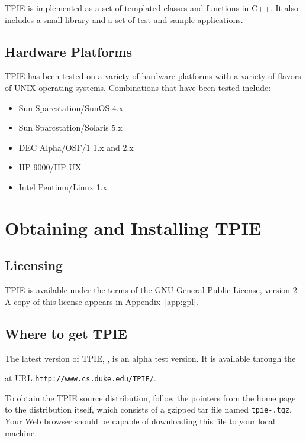 TPIE is implemented as a set of templated classes and functions in
C++. It also includes a small library and a set of test and
sample applications.

\section{Hardware Platforms}

TPIE has been tested on a variety of hardware platforms with a variety
of flavors of UNIX operating systems.  Combinations that have been
tested include:
\begin{itemize}
\item Sun Sparcstation/SunOS 4.x 
\item Sun Sparcstation/Solaris 5.x
\item DEC Alpha/OSF/1 1.x and 2.x
\item HP 9000/HP-UX
\item Intel Pentium/Linux 1.x
\end{itemize}

\chapter{Obtaining and Installing TPIE}

\section{Licensing}

TPIE is available under the terms of the GNU General Public License,
version 2.  A copy of this license appears in Appendix~\ref{app:gpl}.

\section{Where to get TPIE}

The latest version of TPIE, \version, is an alpha test version.  It is
available through the %
\begin{latexonly}
at URL \verb|http://www.cs.duke.edu/TPIE/|.
\end{latexonly}

To obtain the TPIE source distribution, follow the
pointers from the home page to the distribution itself, which consists
of a gzipped tar file named {\tt tpie-\version.tgz}.  Your Web
browser should be capable of downloading this file to your local
machine.

